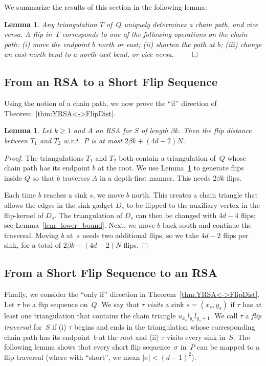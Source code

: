 \documentclass[a4paper,11pt]{article}
\newtheorem{lemma}[theorem]{Lemma}
\newcommand{\noproof}{~\hfill$\qed$}
\newcommand{\qedopt}{}
\newcommand{\ShoLong}[2]{#2}
\begin{document}
\ShoLong{The next lemma describes how the chain path is affected by flips;
see Fig.~\ref{fig_chain_path}.
}
{We summarize the results of this section in the following lemma:
}
\begin{lemma}\label{lem:structure}
Any triangulation $T$ of~$Q$ uniquely determines a chain path, and vice versa.
A flip in~$T$ corresponds to one of the following operations on the chain path:
(i) move the endpoint $b$ north or east;
(ii) shorten the path at $b$;
(iii) change an east-north bend to a north-east bend, or vice versa.\noproof
\end{lemma}

\subsection{From an RSA to a Short Flip Sequence}
Using the notion of a chain path, we now prove the
``if'' direction of Theorem~\ref{thm:YRSA<->FlipDist}.

\begin{lemma}\label{lem:YRTSP->flip_tour}
Let $k \geq 1$ and $A$ an RSA for $S$ of length $\beta k$.
Then the flip distance between $T_1$ and $T_2$ w.r.t.~$P$ is at 
most $2\beta k + (4d-2)N$.
\end{lemma}
\begin{proof}
The triangulations $T_1$ and $T_2$ both contain a triangulation of~$Q$ 
whose chain path has its endpoint $b$  at the root.
We use Lemma~\ref{lem:structure} to generate flips inside $Q$ so
that $b$ traverses $A$ in a depth-first manner.
This needs $2\beta k$ flips.

Each time $b$ reaches a sink $s$, we move $b$ north.
This creates a chain triangle that allows the edges in
the sink gadget $D_s$ to be flipped to the auxiliary vertex
in the flip-kernel of $D_s$. The triangulation of $D_s$ can then be changed
with $4d-4$ flips; see Lemma~\ref{lem_lower_bound}.
Next, we move $b$ back south and continue the traversal.
Moving $b$ at~$s$ needs two additional flips, so we take $4d-2$ flips per sink,
for a total of $2\beta k + (4d-2)N$ flips.
\qedopt
\end{proof}


\subsection{From a Short Flip Sequence to an RSA}
Finally, we consider the ``only if'' direction in Theorem~\ref{thm:YRSA<->FlipDist}.
Let $\tau$ be a flip sequence on~$Q$.
We say that $\tau$ \emph{visits} a sink $s = (x_s,y_s)$ if $\tau$ has at least one triangulation that contains the chain 
triangle $u_{x_s} l_{y_s} l_{y_s + 1}$.
We call $\tau$ a \emph{flip traversal} for~$S$ if (i) $\tau$ begins and ends in the triangulation whose corresponding chain path has its endpoint~$b$ at the root and (ii) $\tau$ visits every sink in~$S$.
The following lemma shows that every short flip sequence~$\sigma$ in~$P$ can be mapped to a flip traversal (where with ``short'', we mean $|\sigma| < (d-1)^2$).
\end{document}
